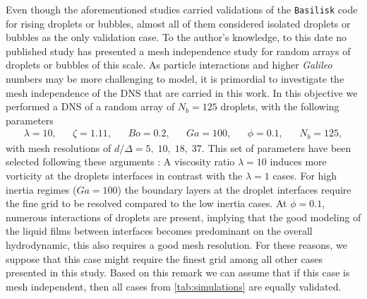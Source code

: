 \documentclass[11pt]{My_preprint}
\begin{document}
Even though the aforementioned studies carried validations of the \texttt{Basilisk} code for rising droplets or bubbles, almost all of them considered isolated droplets or bubbles as the only validation case. 
To the author's knowledge, to this date no published study has presented a mesh independence study for random arrays of droplets or bubbles of this scale. 
As particle interactions and higher \textit{Galileo} numbers may be more challenging to model, it is primordial to investigate the mesh independence of the DNS that are carried in this work. 
In this objective we performed a DNS of a random array of $N_b=125$ droplets, with the following parameters
\begin{align*}
    \lambda = 10,
    && \zeta = 1.11,
    && Bo = 0.2,
    && Ga = 100,
    && \phi = 0.1,
    && N_b =125,
\end{align*}
with mesh resolutions of $d/\Delta = 5,\; 10,\; 18,\; 37$. 
This set of parameters have been selected following these arguments :
A viscosity ratio $\lambda = 10$ induces more vorticity at the droplets interfaces in contrast with the $\lambda = 1$ cases. 
For high inertia regimes ($Ga = 100$) the boundary layers at the droplet interfaces require the fine grid to be resolved compared to the low inertia cases. 
At $\phi = 0.1$, numerous interactions of droplets are present, implying that the good modeling of the liquid films between interfaces becomes predominant on the overall hydrodynamic, this also requires a good mesh resolution. 
For these reasons, we suppose that this case might require the finest grid among all other cases presented in this study. 
Based on this remark we can assume that if this case is mesh independent, then all cases from \ref{tab:simulations} are equally validated. 
\end{document}

